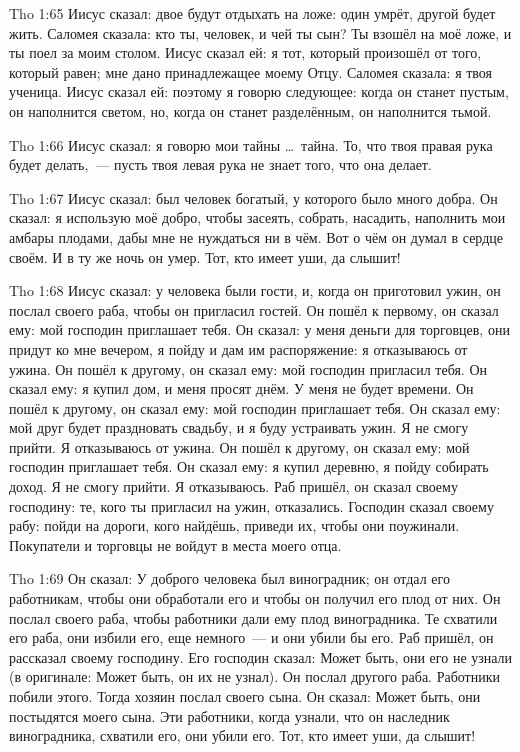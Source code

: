 \vs Tho 1:65
Иисус сказал:
двое будут отдыхать на ложе: один умрёт, другой будет жить.
Саломея сказала: кто ты, человек, и чей ты сын?
Ты взошёл на моё ложе, и ты поел за моим столом.
Иисус сказал ей:
я тот, который произошёл от того, который равен;
мне дано принадлежащее моему Отцу.
Саломея сказала: я твоя ученица.
Иисус сказал ей: поэтому я говорю следующее:
когда он станет пустым, он наполнится светом,
но, когда он станет разделённым, он наполнится тьмой.

\vs Tho 1:66
Иисус сказал:
я говорю мои тайны \ldots\ тайна.
То, что твоя правая рука будет делать,~--- пусть
твоя левая рука не знает того, что она делает.

\vs Tho 1:67
Иисус сказал:
был человек богатый, у которого было много добра.
Он сказал: я использую моё добро,
чтобы засеять, собрать, насадить,
наполнить мои амбары плодами,
дабы мне не нуждаться ни в чём.
Вот о чём он думал в сердце своём.
И в ту же ночь он умер.
Тот, кто имеет уши, да слышит!

\vs Tho 1:68
Иисус сказал:
у человека были гости, и, когда он приготовил ужин,
он послал своего раба, чтобы он пригласил гостей.
Он пошёл к первому, он сказал ему:
мой господин приглашает тебя.
Он сказал: у меня деньги для торговцев, они придут ко мне вечером,
я пойду и дам им распоряжение: я отказываюсь от ужина.
Он пошёл к другому, он сказал ему: мой господин пригласил тебя.
Он сказал ему: я купил дом, и меня просят днём.
У меня не будет времени.
Он пошёл к другому, он сказал ему: мой господин приглашает тебя.
Он сказал ему: мой друг будет праздновать свадьбу,
и я буду устраивать ужин. Я не смогу прийти. Я отказываюсь от ужина.
Он пошёл к другому, он сказал ему: мой господин приглашает тебя.
Он сказал ему: я купил деревню, я пойду собирать доход.
Я не смогу прийти. Я отказываюсь.
Раб пришёл, он сказал своему господину:
те, кого ты пригласил на ужин, отказались.
Господин сказал своему рабу:
пойди на дороги, кого найдёшь, приведи их, чтобы они поужинали.
Покупатели и торговцы не войдут в места моего отца.

\vs Tho 1:69
Он сказал: У доброго человека был виноградник; он отдал его
работникам, чтобы они обработали его и чтобы он получил его плод от них. Он
послал своего раба, чтобы работники дали ему плод виноградника. Те схватили его
раба, они избили его, еще немного~--- и они убили бы его. Раб пришёл, он
рассказал своему господину. Его господин сказал: Может быть, они его не узнали
(в оригинале: Может быть, он их не узнал). Он послал другого раба. Работники
побили этого. Тогда хозяин послал своего сына. Он сказал: Может быть, они
постыдятся моего сына. Эти работники, когда узнали, что он наследник
виноградника, схватили его, они убили его. Тот, кто имеет уши, да слышит!


